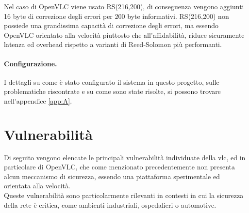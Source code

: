 Nel caso di OpenVLC viene usato RS(216,200), di conseguenza vengono aggiunti 16 byte di correzione degli errori per 200 byte informativi. RS(216,200) non possiede una grandissima capacità di correzione degli errori, ma essendo OpenVLC orientato alla velocità piuttosto che all'affidabilità, riduce sicuramente latenza ed overhead rispetto a varianti di Reed-Solomon più performanti.

\paragraph{Configurazione.}
I dettagli su come è stato configurato il sistema in questo progetto, sulle problematiche riscontrate e su come sono state risolte, si possono trovare nell'appendice \ref{app:A}.


\section{Vulnerabilità}


Di seguito vengono elencate le principali vulnerabilità individuate della \gls{vlc}, ed in particolare di OpenVLC, che come menzionato precedentemente non presenta alcun meccanismo di sicurezza, essendo una piattaforma sperimentale ed orientata alla velocità.\\
Queste vulnerabilità sono particolarmente rilevanti in contesti in cui la sicurezza della rete è critica, come ambienti industriali, ospedalieri o automotive.

